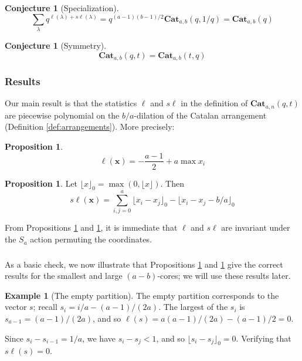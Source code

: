 \documentclass{amsart}[12pt]
\theoremstyle{definition}
\newtheorem{example}[dummy]{Example}
\newtheorem{proposition}[dummy]{Proposition}
\newtheorem{conjecture}[dummy]{Conjecture}
\newcommand{\Cat}{\mathbf{Cat}}
\newcommand{\sk}{s\ell}
\begin{document}
\begin{conjecture}[Specialization]
$$\sum_{\lambda} q^{\ell(\lambda)+\sk(\lambda)}=q^{(a-1)(b-1)/2}\Cat_{a,b}(q,1/q)=\Cat_{a,b}(q)$$
\end{conjecture}

\begin{conjecture}[Symmetry]
$$\Cat_{a,b}(q,t)=\Cat_{a,b}(t,q)$$
\end{conjecture}

\subsubsection{Results}
Our main result is that the statistics $\ell$ and $\sk$ in the definition of $\Cat_{a,n}(q,t)$ are piecewise polynomial on the $b/a$-dilation of the Catalan arrangement (Definition \ref{def:arrangements}).  More precisely:

\begin{proposition}
\label{prop:length}
$$\ell(\mathbf{x})=-\frac{a-1}{2}+a\max x_i$$
\end{proposition}

\begin{proposition}
\label{prop:skewlength}
Let $\lfloor x\rfloor_0=\max\left(0, \lfloor x\rfloor\right)$.
Then
$$\sk(\mathbf{x})=\sum_{i,j=0}^a \lfloor x_i-x_j\rfloor_0 - \lfloor x_i-x_j-b/a\rfloor_0$$
\end{proposition}


From Propositions \ref{prop:length} and \ref{prop:skewlength}, it is immediate that $\ell$ and $\sk$ are invariant under the $S_a$ action permuting the coordinates. 


\subsubsection{}
As a basic check, we now illustrate that Propositions \ref{prop:length} and \ref{prop:skewlength} give the correct results for the smallest and large $(a-b)$-cores; we will use these results later.

\begin{example}[The empty partition]
The empty partition corresponds to the vector $s$; recall $s_i=i/a-(a-1)/(2a)$.  
  The largest of the $s_i$ is $s_{a-1}=(a-1)/(2a)$, and so $\ell(s)=a(a-1)/(2a)-(a-1)/2=0$.  

Since $s_i-s_{i-1}=1/a$, we have $s_i-s_j<1$, and so $\lfloor s_i-s_j\rfloor_0=0$.  Verifying that $\sk(s)=0$.




\end{example}
\end{document}
